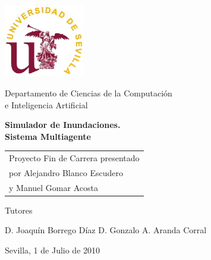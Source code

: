 \thispagestyle{empty}

{
\thispagestyle{empty}
\begin{center}
\includegraphics[width=35mm]{figuras/titulo/logous.png}
\end{center}
\vspace*{0cm}
\Large
\begin{center}
{\normalsize \sc
Departamento de Ciencias de la Computación \\ e Inteligencia Artificial \\}

\end{center}

\vspace{0.5cm}

\LARGE

\begin{center}
{\bf Simulador de Inundaciones. \\ Sistema Multiagente}
\end{center}

\Large

\vspace*{2cm}
\vfill

\hspace*{.5\textwidth}
\normalsize
\begin{tabular}{l}

Proyecto Fin de Carrera presentado\\
por Alejandro Blanco Escudero \\
y Manuel Gomar Acosta \\

\end{tabular} \par

\vspace*{-2.9cm}

Tutores

\vspace*{4cm}

D. Joaquín Borrego Díaz\newline
D. Gonzalo A. Aranda Corral\newline

Sevilla, 1 de Julio de 2010 %

}
